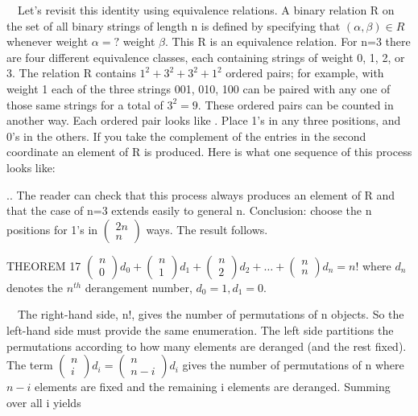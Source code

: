 \documentclass{article}
\begin{document}
\ \ Let’s revisit this identity using equivalence relations.  A binary relation R on the set of all binary strings of
length n is defined by specifying that  $\left(\alpha ,\beta \right){\in}R$ whenever weight  $\alpha =?$ weight  $\beta
$.  This R is an equivalence relation.  For n=3 there are four different equivalence classes, each containing strings
of weight 0, 1, 2, or 3.  The relation R contains  $1^2+3^2+3^2+1^2$ ordered pairs; for example, with weight 1 each of
the three strings 001, 010, 100 can be paired with any one of those same strings for a total of  $3^2=9$. These ordered
pairs can be counted in another way.  Each ordered pair looks like  $.$  Place 1’s in any three positions, and 0’s in
the others.  If you take the complement of the entries in the second coordinate an element of  R  is produced.  Here is
what one sequence of this process looks like: 

 $.$.  The reader can check that this process always produces an element of  R  and that the case of n=3 extends easily
to general n. Conclusion: choose the  n  positions for 1’s  in  $\left(\begin{matrix}2n\\n\end{matrix}\right)$ ways. 
The result follows.

THEOREM 17  
$\left(\begin{matrix}n\\0\end{matrix}\right)d_0+\left(\begin{matrix}n\\1\end{matrix}\right)d_1+\left(\begin{matrix}n\\2\end{matrix}\right)d_2+{\dots}+\left(\begin{matrix}n\\n\end{matrix}\right)d_n=n!$
where  $d_n$ denotes the  $n^{\mathit{th}}$ derangement number,  $d_0=1,d_1=0.$

\ \ The right-hand side, n!, gives the number of permutations of  n objects.  So the left-hand side must provide the
same enumeration.  The left side partitions the permutations according to how many elements are deranged (and the rest
fixed).  The term  $\left(\begin{matrix}n\\i\end{matrix}\right)d_i=\left(\begin{matrix}n\\n-i\end{matrix}\right)d_i$
gives the number of permutations of n where  $n-i$ elements are fixed and the remaining i elements are deranged. 
Summing over all i yields
\end{document}
